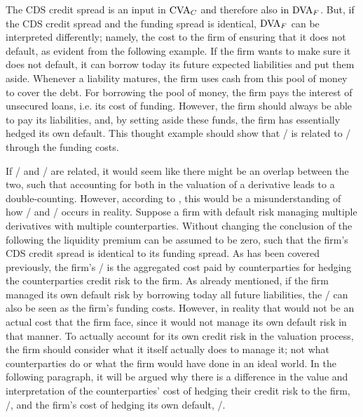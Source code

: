 \documentclass[main.tex]{subfiles}
\begin{document}
    The CDS credit spread is an input in $\CVA/_{C}$ and therefore also in $\DVA/_{F}$.
    But, if the CDS credit spread and the funding spread is identical, 
    $\DVA/_{F}$ can be interpreted differently;
    namely, the cost to the firm of ensuring that it does not default, 
    as evident from the following example.
    If the firm wants to make sure it does not default,
    it can borrow today its future expected liabilities and put them aside.
    Whenever a liability matures, the firm uses cash from this pool of money to cover the debt.
    For borrowing the pool of money, the firm pays the interest of unsecured loans, 
    i.e. its cost of funding.
    However, the firm should always be able to pay its liabilities,
    and, by setting aside these funds, the firm has essentially hedged its own default. 
    This thought example should show that \DVA/ is related to \FVA/ through the funding costs.
    
    If \DVA/ and \FVA/ are related, it would seem like there might be an overlap between the two,
    such that accounting for both in the valuation of a derivative leads to a double-counting.
    However, according to \textcite{Ruiz2015XVA}, 
    this would be a misunderstanding of how \DVA/ and \FVA/ occurs in reality.
    Suppose a firm with default risk managing multiple derivatives with multiple counterparties.
    Without changing the conclusion of the following the liquidity premium can be assumed to be zero, 
    such that the firm's CDS credit spread is identical to its funding spread.
    As has been covered previously, the firm's \DVA/ is the aggregated cost
    paid by counterparties for hedging the counterparties credit risk to the firm.
    As already mentioned, if the firm managed its own default risk 
    by borrowing today all future liabilities,
    the \DVA/ can also be seen as the firm's funding costs.
    However, in reality that would not be an actual cost that the firm face,
    since it would not manage its own default risk in that manner.
    To actually account for its own credit risk in the valuation process,
    the firm should consider what it itself actually does to manage it;
    not what counterparties do or what the firm would have done in an ideal world.
    In the following paragraph, it will be argued why there is a difference 
    in the value and interpretation 
    of the counterparties' cost of hedging their credit risk to the firm, \DVA/,
    and the firm's cost of hedging its own default, \FVA/.
\end{document}
